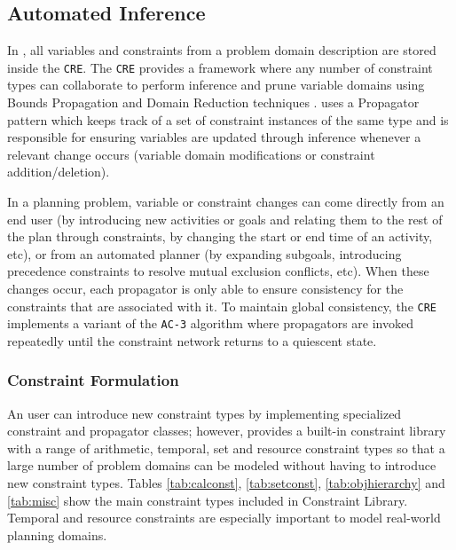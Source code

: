 \subsection{Automated Inference}
\label{sec:europa:inference}

In \eue, all variables and constraints from a problem domain
description are stored inside the \texttt{CRE}.  The \texttt{CRE}
provides a framework where any number of constraint types can
collaborate to perform inference and prune variable domains using
Bounds Propagation and Domain Reduction techniques \cite{marriott98}. 
\eu uses a Propagator pattern which keeps track of a set of
constraint instances of the same type and is responsible for ensuring
variables are updated through inference whenever a relevant change occurs
 (variable domain modifications or constraint addition/deletion).

In a planning problem, variable or constraint changes can come
directly from an end user (by introducing new activities or goals and
relating them to the rest of the plan through constraints, by changing
the start or end time of an activity, etc), or from an automated planner (by
expanding subgoals, introducing precedence constraints to resolve
mutual exclusion conflicts, etc). When these changes occur, each
propagator is only able to ensure consistency for the constraints that
are associated with it.  To maintain global consistency, the
\texttt{CRE} implements a variant of the \texttt{AC-3} algorithm
\cite{mackworth77} where propagators are invoked repeatedly until
the constraint network returns to a quiescent state.

\subsubsection{Constraint Formulation}
\label{sec:europa:constraints}

An \eu user can introduce new constraint types by implementing
specialized constraint and propagator classes; however, \eu provides a
built-in constraint library with a range of arithmetic, temporal, set
and resource constraint types so that a large number of problem
domains can be modeled without having to introduce new constraint
types. Tables \ref{tab:calconst}, \ref{tab:setconst},
\ref{tab:objhierarchy} and \ref{tab:misc} show the main constraint
types included in \eus Constraint Library.  Temporal and resource
constraints are especially important to model real-world planning
domains.



